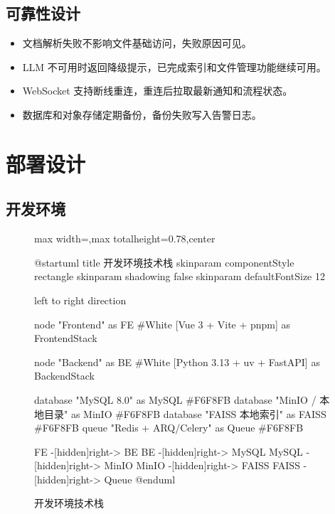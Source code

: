 \documentclass[a4paper,zihao=-4]{ctexart}
\providecommand{\tightlist}{%
  \setlength{\itemsep}{0pt}\setlength{\parskip}{0pt}}
\begin{document}
\hypertarget{ux53efux9760ux6027ux8bbeux8ba1}{%
\subsection{可靠性设计}\label{ux53efux9760ux6027ux8bbeux8ba1}}

\begin{itemize}
\tightlist
\item
  文档解析失败不影响文件基础访问，失败原因可见。
\item
  LLM 不可用时返回降级提示，已完成索引和文件管理功能继续可用。
\item
  WebSocket 支持断线重连，重连后拉取最新通知和流程状态。
\item
  数据库和对象存储定期备份，备份失败写入告警日志。
\end{itemize}

\hypertarget{ux90e8ux7f72ux8bbeux8ba1}{%
\section{部署设计}\label{ux90e8ux7f72ux8bbeux8ba1}}

\hypertarget{ux5f00ux53d1ux73afux5883}{%
\subsection{开发环境}\label{ux5f00ux53d1ux73afux5883}}

\begin{figure}[H]
\centering
\begin{adjustbox}{max width=\linewidth,max totalheight=0.78\textheight,center}
\begingroup
\renewcommand{\PlantUMLJobname}{plantuml-diagrams/req-uml-12}
\begin{plantuml}
@startuml
title 开发环境技术栈
skinparam componentStyle rectangle
skinparam shadowing false
skinparam defaultFontSize 12

left to right direction

node "Frontend" as FE #White {
  [Vue 3 + Vite + pnpm] as FrontendStack
}

node "Backend" as BE #White {
  [Python 3.13 + uv + FastAPI] as BackendStack
}

database "MySQL 8.0" as MySQL #F6F8FB
database "MinIO / 本地目录" as MinIO #F6F8FB
database "FAISS 本地索引" as FAISS #F6F8FB
queue "Redis + ARQ/Celery" as Queue #F6F8FB

FE -[hidden]right-> BE
BE -[hidden]right-> MySQL
MySQL -[hidden]right-> MinIO
MinIO -[hidden]right-> FAISS
FAISS -[hidden]right-> Queue
@enduml
\end{plantuml}
\endgroup
\end{adjustbox}
\caption{开发环境技术栈}
\end{figure}
\end{document}

